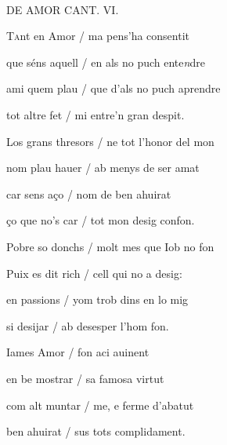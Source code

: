 \documentclass[12pt]{article}
\renewcommand{\espaiAbansEtiquetaPoema}{\vspace{0ex}}
\begin{document}
\begin{estrofa}

\espaiAbansEtiquetaPoema

\\

\begin{rubrica}

DE AMOR CANT. VI.

\end{rubrica}

\end{estrofa}


\begin{estrofa}

 T\textsc{a}nt en Amor / ma pens'ha consentit

 que s\'{e}ns aquell / en als no puch ente\textit{n}dre

 ami quem plau / que d'als no puch aprendre

 tot altre fet / mi entre'n gran despit.

 Los grans thresors / ne tot l'honor del mon

 nom plau hauer / ab menys de ser amat

 car sens a\c{c}o / nom de ben ahuirat

 \c{c}o que no's car / tot mon desig confon.

\end{estrofa}



\begin{estrofa}

 Pobre so donchs / molt mes que Iob no fon

 Puix es dit rich / cell qui no a desig:

 en passions / yom trob dins en lo mig

 si desijar / ab desesper l'hom fon.

 Iames Amor / fon aci auinent

 en be mostrar / sa famosa virtut

 com alt muntar / me, e ferme d'abatut

 ben ahuirat / sus tots complidament.

\end{estrofa}
\end{document}
